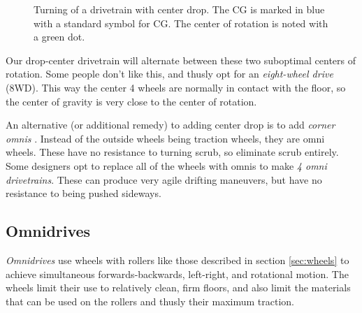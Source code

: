 \begin{figure}[H]
\begin{subfigure}[]{0.5\linewidth}
\end{subfigure}
\caption{Turning of a drivetrain with center drop. The CG is marked in blue with a standard symbol for CG. The center of rotation is noted with a green dot.}
\end{figure}

Our drop-center drivetrain will alternate between these two suboptimal centers of rotation. Some people don't like this, and thusly opt for an \textit{eight-wheel drive} (8WD). This way the center 4 wheels are normally in contact with the floor, so the center of gravity is very close to the center of rotation.

An alternative (or additional remedy) to adding center drop is to add \textit{corner omnis} . Instead of the outside wheels being traction wheels, they are omni wheels. These have no resistance to turning scrub, so eliminate scrub entirely. Some designers opt to replace all of the wheels with omnis to make \textit{4 omni drivetrains}. These can produce very agile drifting maneuvers, but have no resistance to being pushed sideways.

\subsection{Omnidrives}
\textit{Omnidrives} use wheels with rollers like those described in section \ref{sec:wheels} to achieve simultaneous forwards-backwards, left-right, and rotational motion. The wheels limit their use to relatively clean, firm floors, and also limit the materials that can be used on the rollers and thusly their maximum traction.

